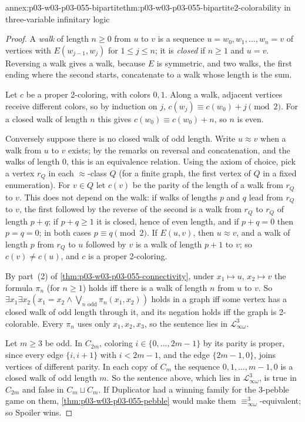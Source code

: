 \begin{annexitem}{annex:p03-w03-p03-055-bipartite}{thm:p03-w03-p03-055-bipartite}{2-colorability in three-variable infinitary logic}
\begin{proof}
A \emph{walk} of length \(n\ge0\) from \(u\) to \(v\) is a sequence
\(u=w_0,w_1,\ldots,w_n=v\) of vertices with \(E(w_{j-1},w_j)\) for
\(1\le j\le n\); it is \emph{closed} if \(n\ge1\) and \(u=v\). Reversing a
walk gives a walk, because \(E\) is symmetric, and two walks, the first
ending where the second starts, concatenate to a walk whose length is the
sum.

Let \(c\) be a proper 2-coloring, with colors \(0,1\). Along a walk, adjacent
vertices receive different colors, so by induction on \(j\),
\(c(w_j)\equiv c(w_0)+j\pmod2\). For a closed walk of length \(n\) this gives
\(c(w_0)\equiv c(w_0)+n\), so \(n\) is even.

Conversely suppose there is no closed walk of odd length. Write
\(u\approx v\) when a walk from \(u\) to \(v\) exists; by the remarks on
reversal and concatenation, and the walks of length \(0\), this is an
equivalence relation. Using the axiom of choice, pick a vertex \(r_Q\) in
each \(\approx\)-class \(Q\) (for a finite graph, the first vertex of \(Q\)
in a fixed enumeration). For \(v\in Q\) let \(c(v)\) be the parity of the
length of a walk from \(r_Q\) to \(v\). This does not depend on the walk: if
walks of lengths \(p\) and \(q\) lead from \(r_Q\) to \(v\), the first
followed by the reverse of the second is a walk from \(r_Q\) to \(r_Q\) of
length \(p+q\); if \(p+q\ge1\) it is closed, hence of even length, and if
\(p+q=0\) then \(p=q=0\); in both cases \(p\equiv q\pmod2\). If \(E(u,v)\),
then \(u\approx v\), and a walk of length \(p\) from \(r_Q\) to \(u\)
followed by \(v\) is a walk of length \(p+1\) to \(v\); so
\(c(v)\neq c(u)\), and \(c\) is a proper 2-coloring.

By part~(2) of \cref{thm:p03-w03-p03-055-connectivity}, under
\(x_1\mapsto u\), \(x_2\mapsto v\) the formula \(\pi_n\) (for \(n\ge1\))
holds iff there is a walk of length \(n\) from \(u\) to \(v\). So
\(\exists x_1\exists x_2(x_1=x_2\wedge\bigvee_{n\text{ odd}}\pi_n(x_1,x_2))\)
holds in a graph iff some vertex has a closed walk of odd length through
it, and its negation holds iff the graph is 2-colorable. Every \(\pi_n\)
uses only \(x_1,x_2,x_3\), so the sentence lies in
\(\mathcal L^3_{\infty\omega}\).

Let \(m\ge3\) be odd. In \(C_{2m}\), coloring \(i\in\{0,\ldots,2m-1\}\) by its
parity is proper, since every edge \(\{i,i+1\}\) with \(i<2m-1\), and the edge
\(\{2m-1,0\}\), joins vertices of different parity. In each copy of \(C_m\)
the sequence \(0,1,\ldots,m-1,0\) is a closed walk of odd length \(m\). So
the sentence above, which lies in \(\mathcal L^3_{\infty\omega}\), is true in
\(C_{2m}\) and false in \(C_m\sqcup C_m\). If Duplicator had a winning family
for the \(3\)-pebble game on them, \cref{thm:p03-w03-p03-055-pebble} would make
them \(\equiv^3_{\infty\omega}\)-equivalent; so Spoiler wins.
\end{proof}
\end{annexitem}
